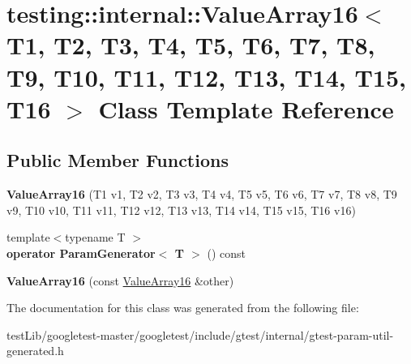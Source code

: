 \hypertarget{classtesting_1_1internal_1_1ValueArray16}{}\section{testing\+:\+:internal\+:\+:Value\+Array16$<$ T1, T2, T3, T4, T5, T6, T7, T8, T9, T10, T11, T12, T13, T14, T15, T16 $>$ Class Template Reference}
\label{classtesting_1_1internal_1_1ValueArray16}
\subsection*{Public Member Functions}
\begin{DoxyCompactItemize}
\item 
\mbox{\label{classtesting_1_1internal_1_1ValueArray16_ac12b3a15ab5418665a97b4a225438529}} 
{\bfseries Value\+Array16} (T1 v1, T2 v2, T3 v3, T4 v4, T5 v5, T6 v6, T7 v7, T8 v8, T9 v9, T10 v10, T11 v11, T12 v12, T13 v13, T14 v14, T15 v15, T16 v16)
\item 
\mbox{\label{classtesting_1_1internal_1_1ValueArray16_ae4f1174da079ca0d674497f5e452274c}} 
{\footnotesize template$<$typename T $>$ }\\{\bfseries operator Param\+Generator$<$ T $>$} () const
\item 
\mbox{\label{classtesting_1_1internal_1_1ValueArray16_a867f767c90905de55a8b4933881d144b}} 
{\bfseries Value\+Array16} (const \hyperlink{classtesting_1_1internal_1_1ValueArray16}{Value\+Array16} \&other)
\end{DoxyCompactItemize}


The documentation for this class was generated from the following file\+:\begin{DoxyCompactItemize}
\item 
test\+Lib/googletest-\/master/googletest/include/gtest/internal/gtest-\/param-\/util-\/generated.\+h\end{DoxyCompactItemize}

